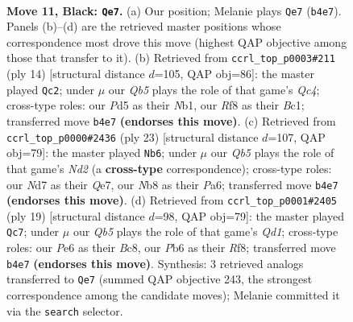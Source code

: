 \documentclass[11pt]{article}
\begin{document}
\clearpage

\begin{figure}[p]\centering
\begin{subfigure}{0.46\textwidth}\centering
\resizebox{\linewidth}{!}{%
\newchessgame
\chessboard[
  setfen={rnb2rk1/2pn1ppp/pp2p3/3pP3/1q1P1P1P/8/PPP1NKP1/1R1Q1BNR b - - 1 11},
  showmover=false,
  pgfstyle=straightmove, color=movearrow, markmove={b4-e7}
]}
\caption{}
\end{subfigure}\hfill
\begin{subfigure}{0.46\textwidth}\centering
\resizebox{\linewidth}{!}{%
\newchessgame
\chessboard[
  setfen={r1bqk2r/pp1n1ppp/2pb1n2/4p3/2Q5/5NP1/PP1PPPBP/RNB2RK1 w kq - 1 8},
  showmover=false,
  pgfstyle=straightmove, color=movearrow, markmove={c4-c2}
]}
\caption{}
\end{subfigure}
\\[4pt]
\begin{subfigure}{0.46\textwidth}\centering
\resizebox{\linewidth}{!}{%
\newchessgame
\chessboard[
  setfen={r1b2rk1/1p1nqppp/p1n1p3/3pP3/3P1P1P/5N2/PP2N1P1/R2QKB1R b KQ - 0 12},
  showmover=false,
  pgfstyle=straightmove, color=movearrow, markmove={d7-b6}
]}
\caption{}
\end{subfigure}\hfill
\begin{subfigure}{0.46\textwidth}\centering
\resizebox{\linewidth}{!}{%
\newchessgame
\chessboard[
  setfen={r1bq1rk1/pp3pbp/2n2np1/2p1p3/4P3/2P2NP1/PP1N1PBP/R1BQR1K1 b - - 0 10},
  showmover=false,
  pgfstyle=straightmove, color=movearrow, markmove={d8-c7}
]}
\caption{}
\end{subfigure}
\caption{\textbf{Move 11, Black: \texttt{Qe7}.} (a) Our position; Melanie plays \texttt{Qe7} (\texttt{b4e7}). Panels (b)--(d) are the retrieved master positions whose correspondence most drove this move (highest QAP objective among those that transfer to it). (b) Retrieved from \texttt{ccrl\_top\_p0003\#211} (ply 14) [structural distance $d$=105, QAP obj=86]: the master played \texttt{Qc2}; under $\mu$ our \emph{Qb5} plays the role of that game's \emph{Qc4}; cross-type roles: our \emph{P}d5 as their \emph{N}b1, our \emph{R}f8 as their \emph{B}c1; transferred move \texttt{b4e7} \textbf{(endorses this move)}. (c) Retrieved from \texttt{ccrl\_top\_p0000\#2436} (ply 23) [structural distance $d$=107, QAP obj=79]: the master played \texttt{Nb6}; under $\mu$ our \emph{Qb5} plays the role of that game's \emph{Nd2} (a \textbf{cross-type} correspondence); cross-type roles: our \emph{N}d7 as their \emph{Q}e7, our \emph{N}b8 as their \emph{P}a6; transferred move \texttt{b4e7} \textbf{(endorses this move)}. (d) Retrieved from \texttt{ccrl\_top\_p0001\#2405} (ply 19) [structural distance $d$=98, QAP obj=79]: the master played \texttt{Qc7}; under $\mu$ our \emph{Qb5} plays the role of that game's \emph{Qd1}; cross-type roles: our \emph{P}e6 as their \emph{B}c8, our \emph{P}b6 as their \emph{R}f8; transferred move \texttt{b4e7} \textbf{(endorses this move)}. Synthesis: 3 retrieved analogs transferred to \texttt{Qe7} (summed QAP objective 243, the strongest correspondence among the candidate moves); Melanie committed it via the \texttt{search} selector.}
\label{fig:thought-m21}
\end{figure}
\end{document}
